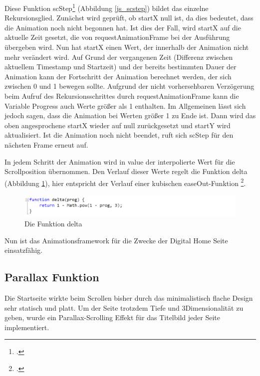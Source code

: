 Diese Funktion scStep\footcite[vgl.][]{rAF} (Abbildung \ref{js_scstep}) bildet das einzelne Rekursionsglied. Zunächst wird geprüft, ob startX null ist, da dies bedeutet, dass die Animation noch nicht begonnen hat. Ist dies der Fall, wird startX auf die aktuelle Zeit gesetzt, die von requestAnimationFrame bei der Ausführung übergeben wird. Nun hat startX einen Wert, der innerhalb der Animation nicht mehr verändert wird. Auf Grund der vergangenen Zeit (Differenz zwischen aktuellem Timestamp und Startzeit) und der bereits bestimmten Dauer der Animation kann der Fortschritt der Animation berechnet werden, der sich zwischen 0 und 1 bewegen sollte. Aufgrund der nicht vorhersehbaren Verzögerung beim Aufruf des Rekursionsschrittes durch requestAnimationFrame kann die Variable Progress auch Werte größer als 1 enthalten. Im Allgemeinen lässt sich jedoch sagen, dass die Animation bei Werten größer 1 zu Ende ist. Dann wird das oben angesprochene startX wieder auf null zurückgesetzt und startY wird aktualisiert. Ist die Animation noch nicht beendet, ruft sich scStep für den nächsten Frame erneut auf.

In jedem Schritt der Animation wird in value der interpolierte Wert für die Scrollposition übernommen. Den Verlauf dieser Werte regelt die Funktion delta (Abbildung \ref{js_delta}), hier entspricht der Verlauf einer kubischen easeOut-Funktion \footcite[vgl.][]{easeOut}.

\begin{figure} [h]
\includegraphics[width=\textwidth]{./img/js_delta.png}
\caption{Die Funktion delta}
\label{js_delta}
\end{figure}

Nun ist das Animationsframework für die Zwecke der Digital Home Seite einsatzfähig.

\subsection{Parallax Funktion}
Die Startseite wirkte beim Scrollen bisher durch das minimalistisch flache Design sehr statisch und platt. Um der Seite trotzdem Tiefe und 3Dimensionalität zu geben, wurde ein Parallax-Scrolling Effekt für das Titelbild jeder Seite implementiert.

